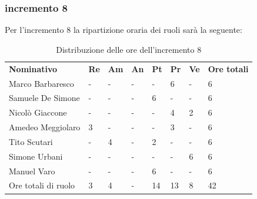 \subsubsection{incremento 8}
Per l'incremento 8 la ripartizione oraria dei ruoli sarà la seguente:
\begin{center}
    \begin{table}[ht!]
        \centering
        \caption{Distribuzione delle ore dell'incremento 8}
        \vspace{5px}
        \renewcommand{\arraystretch}{1.8}
        \begin{tabular}{p{100px} p{20px} p{20px} p{20px} p{20px} p{20px} p{20px} p{50px} }
            \rowcolor{logo!70} \textbf{Nominativo} & \textbf{Re} & \textbf{Am} & \textbf{An} & \textbf{Pt} & \textbf{Pr} & \textbf{Ve} & \textbf{Ore totali} \\
            Marco Barbaresco                       & -           & -           & -           & -           & 6           & -           & 6                   \\
            Samuele De Simone                      & -           & -           & -           & 6           & -           & -           & 6                   \\
            Nicolò Giaccone                        & -           & -           & -           & -           & 4           & 2           & 6                   \\
            Amedeo Meggiolaro                      & 3           & -           & -           & -           & 3           & -           & 6                   \\
            Tito Scutari                           & -           & 4           & -           & 2           & -           & -           & 6                   \\
            Simone Urbani                          & -           & -           & -           & -           & -           & 6           & 6                   \\
            Manuel Varo                            & -           & -           & -           & 6           & -           & -           & 6                   \\
            Ore totali di ruolo                    & 3           & 4           & -           & 14          & 13          & 8           & 42                  \\
        \end{tabular}
    \end{table}
\end{center}
